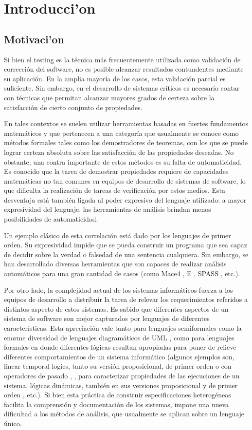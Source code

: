 \chapter{Introducci'on}
\section{Motivaci'on}

Si bien el testing es la técnica más frecuentemente utilizada como validación de corrección del software, no es posible alcanzar resultados contundentes mediante su aplicación. En la amplia mayoría de los casos, esta validación parcial es suficiente. Sin embargo, en el desarrollo de sistemas críticos es necesario contar con técnicas que permitan alcanzar mayores grados de certeza sobre la satisfacción de cierto conjunto de propiedades.

En tales contextos se suelen utilizar herramientas basadas en fuertes fundamentos matemáticos y que pertenecen a una categoría que usualmente se conoce como métodos formales tales como los demostradores de teoremas, con los que se puede lograr certeza absoluta sobre las satisfacción de las propiedades deseadas. No obstante, una contra importante de estos métodos es su falta de automaticidad. Es conocido que la tarea de demostrar propiedades requiere de capacidades matemáticas no tan comunes en equipos de desarrollo de sistemas de software, lo que dificulta la realización de tareas de verificación por estos medios. Esta desventaja está también ligada al poder expresivo del lenguaje utilizado: a mayor expresividad del lenguaje, las herramientas de análisis brindan menos posibilidades de automaticidad.

Un ejemplo clásico de esta correlación está dado por los lenguajes de primer orden. Su expresividad impide que se pueda construir un programa que sea capaz de decidir sobre la verdad o falsedad de una sentencia cualquiera. Sin embargo, se han desarrollado diversas herramientas que son capaces de realizar análisis automáticos para una gran cantidad de casos (como Mace4 \cite{m05}, E \cite{s13}, SPASS \cite{WDFKSW09}, etc.). 

Por otro lado, la complejidad actual de los sistemas informáticos fuerza a los equipos de desarrollo a distribuir la tarea de relevar los requerimientos referidos a distintos aspecto de estos sistemas. Es sabido que diferentes aspectos de un sistema de software son mejor capturados por lenguajes de diferentes características. Esta apreciación vale tanto para lenguajes semiformales como la enorme diversidad de lenguajes diagramáticos de UML \cite{BRJ98}, como para lenguajes formales en donde diferentes lógicas resultan apropiadas para poner de relieve diferentes comportamientos de un sistema informático (algunos ejemplos son, linear temporal logics, tanto su versión proposicional, de primer orden o con operadores de pasado \cite{Pnu77}, \cite{MP95}, para caracterizar propiedades de las ejecuciones de un sistema, lógicas dinámicas, también en sus versiones proposicional y de primer orden \cite{HKT00}, etc.). Si bien esta práctica de construir especificaciones heterogéneas facilita la comprensión y documentación de los sistemas, impone una nueva dificultad a los métodos de análisis, que usualmente se aplican sobre un lenguaje único.


